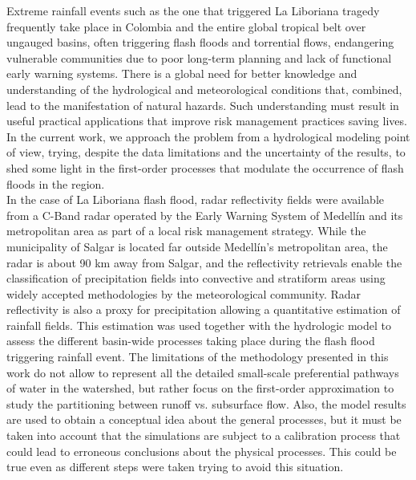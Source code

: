 \documentclass[hess, manuscript]{copernicus}
\begin{document}
\conclusions[Conclusions]
\label{sec:conclusions}

Extreme rainfall events such as the one that triggered La Liboriana tragedy frequently take place in Colombia and the entire global tropical belt over ungauged basins, often triggering flash floods and torrential flows, endangering vulnerable communities due to poor long-term planning and lack of functional early warning systems. There is a global need for better knowledge and understanding of the hydrological and meteorological conditions that, combined, lead to the manifestation of natural hazards. Such understanding must result in useful practical applications that improve risk management practices saving lives. In the current work, we approach the problem from a hydrological modeling point of view, trying, despite the data limitations and the uncertainty of the results, to shed some light in the first-order processes that modulate the occurrence of flash floods in the region.  \\  

In the case of La Liboriana flash flood, radar reflectivity fields were available from a C-Band radar operated by the Early Warning System of Medellín and its metropolitan area as part of a local risk management strategy. While the municipality of Salgar is located far outside Medellín's metropolitan area, the radar is about 90 km away from Salgar, and the reflectivity retrievals enable the classification of precipitation fields into convective and stratiform areas using widely accepted methodologies by the meteorological community.  Radar reflectivity is also a proxy for precipitation allowing a quantitative estimation of rainfall fields. This estimation was used together with the hydrologic model to assess the different basin-wide processes taking place during the flash flood triggering rainfall event.  The limitations of the methodology presented in this work do not allow to represent all the detailed small-scale preferential pathways of water in the watershed, but rather focus on the first-order approximation to study the partitioning between runoff vs. subsurface flow. Also, the model results are used to obtain a conceptual idea about the general processes, but it must be taken into account that the simulations are subject to a calibration process that could lead to erroneous conclusions about the physical processes. This could be true even as different steps were taken trying to avoid this situation.  \\
\end{document}
